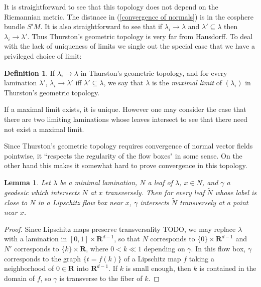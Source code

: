 \documentclass[reqno,10pt]{amsart}
\newcommand{\RR}{\mathbf{R}}
\newcommand{\dfn}[1]{\emph{#1}\index{#1}}
\newtheorem{lemma}[theorem]{Lemma}
\theoremstyle{definition}
\newtheorem{definition}[theorem]{Definition}
\numberwithin{equation}{section}
\begin{document}
It is straightforward to see that this topology does not depend on the Riemannian metric.
The distnace in (\ref{convergence of normals}) is in the cosphere bundle $S'M$.
It is also straightforward to see that if $\lambda_i \to \lambda$ and $\lambda' \subseteq \lambda$ then $\lambda_i \to \lambda'$.
Thus Thurston's geometric topology is very far from Hausdorff.
To deal with the lack of uniqueness of limits we single out the special case that we have a privileged choice of limit:

\begin{definition}
If $\lambda_i \to \lambda$ in Thurston's geometric topology, and for every lamination $\lambda'$, $\lambda_i \to \lambda'$ iff $\lambda' \subseteq \lambda$, we say that $\lambda$ is the \dfn{maximal limit} of $(\lambda_i)$ in Thurston's geometric topology.
\end{definition}

If a maximal limit exists, it is unique.
However one may consider the case that there are two limiting laminations whose leaves intersect to see that there need not exist a maximal limit.

Since Thurston's geometric topology requires convergence of normal vector fields pointwise, it ``respects the regularity of the flow boxes" in some sense.
On the other hand this makes it somewhat hard to prove convergence in this topology.

\begin{lemma}\label{transverse at one implies transverse at all}
Let $\lambda$ be a minimal lamination, $N$ a leaf of $\lambda$, $x \in N$, and $\gamma$ a geodesic which intersects $N$ at $x$ transversely.
Then for every leaf $\tilde N$ whose label is close to $N$ in a Lipschitz flow box near $x$, $\gamma$ intersects $\tilde N$ transversely at a point near $x$.
\end{lemma}
\begin{proof}
Since Lipschitz maps preserve transversality TODO, we may replace $\lambda$ with a lamination in $[0, 1] \times \RR^{d - 1}$, so that $N$ corresponds to $\{0\} \times \RR^{d - 1}$ and $N'$ corresponds to $\{k\} \times \RR$, where $0 < k \ll 1$ depending on $\gamma$.
In this flow box, $\gamma$ corresponds to the graph $\{t = f(k)\}$ of a Lipschitz map $f$ taking a neighborhood of $0 \in \RR$ into $\RR^{d - 1}$.
If $k$ is small enough, then $k$ is contained in the domain of $f$, so $\gamma$ is transverse to the fiber of $k$.
\end{proof}
\end{document}
